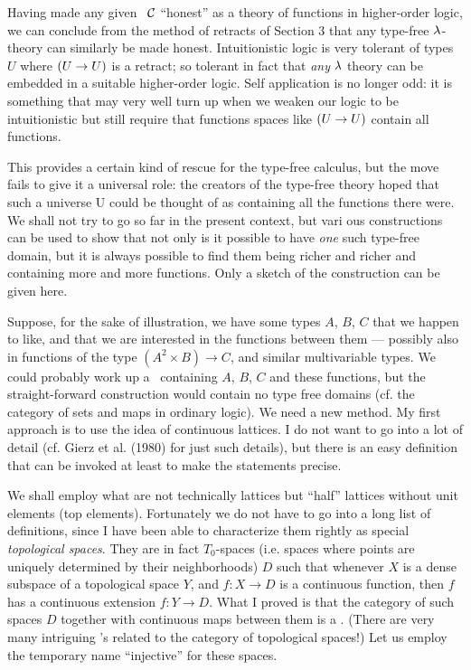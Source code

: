 Having made any given \ccc\ $\mathcal C$ ``honest'' as a theory of functions in higher-order
logic, we can conclude from the method of retracts of Section 3 that any type-free
$\lambda$-theory can similarly be made honest. Intuitionistic logic is very tolerant of types
$U$ where $(U\rightarrow U)$ is a retract; so tolerant in fact that {\it any} $\lambda$ theory can be
embedded in a suitable higher-order logic. Self application is no longer odd: it is
something that may very well turn up when we weaken our logic to be intuitionistic but
still require that functions spaces like $(U\rightarrow U)$ contain all functions.

This provides a certain kind of rescue for the type-free calculus, but the move fails to
give it a universal role: the creators of the type-free theory hoped that such a universe
U could be thought of as containing all the functions there were. We shall not try to go
so far in the present context, but vari ous constructions can be used to show that not
only is it possible to have {\it one} such type-free domain, but it is always possible to
find them being richer and richer and containing more and more functions. Only a sketch of
the construction can be given here.

Suppose, for the sake of illustration, we have some types $A$, $B$, $C$ that we happen to
like, and that we are interested in the functions between them --- possibly also in
functions of the type $(A^2 \times B) \to C$, and similar multivariable types. We could
probably work up a \ccc\  containing $A$, $B$, $C$ and these functions, but the
straight-forward construction would contain no type free domains (cf. the category of sets
and maps in ordinary logic). We need a new method. My first approach is to use the idea of
continuous lattices. I do not want to go into a lot of detail (cf. Gierz et al. (1980) for
just such details), but there is an easy definition that can be invoked at least to make
the statements precise.

We shall employ what are not technically lattices but ``half'' lattices without unit
elements (top elements). Fortunately we do not have to go into a long list of definitions,
since I have been able to characterize them rightly as special {\it topological spaces}.
They are in fact $T_0$-spaces (i.e. spaces where points are uniquely determined by their
neighborhoods) $D$ such that whenever $X$ is a dense subspace of a topological space $Y$,
and $f : X\to D$ is a continuous function, then $f$ has a continuous extension $f:Y\to D$.
What I proved is that the category of such spaces $D$ together with continuous maps
between them is a \ccc . (There are very many intriguing \ccc's related to the category of
topological spaces!) Let us employ the temporary name ``injective'' for these spaces.

